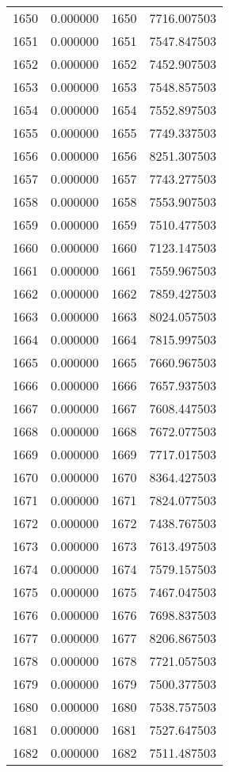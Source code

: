 \documentclass[12pt]{article}
\begin{document}
\begin{longtable}{@{}cccc@{}}
1650 & 0.000000 & 1650 & 7716.007503 \\
1651 & 0.000000 & 1651 & 7547.847503 \\
1652 & 0.000000 & 1652 & 7452.907503 \\
1653 & 0.000000 & 1653 & 7548.857503 \\
1654 & 0.000000 & 1654 & 7552.897503 \\
1655 & 0.000000 & 1655 & 7749.337503 \\
1656 & 0.000000 & 1656 & 8251.307503 \\
1657 & 0.000000 & 1657 & 7743.277503 \\
1658 & 0.000000 & 1658 & 7553.907503 \\
1659 & 0.000000 & 1659 & 7510.477503 \\
1660 & 0.000000 & 1660 & 7123.147503 \\
1661 & 0.000000 & 1661 & 7559.967503 \\
1662 & 0.000000 & 1662 & 7859.427503 \\
1663 & 0.000000 & 1663 & 8024.057503 \\
1664 & 0.000000 & 1664 & 7815.997503 \\
1665 & 0.000000 & 1665 & 7660.967503 \\
1666 & 0.000000 & 1666 & 7657.937503 \\
1667 & 0.000000 & 1667 & 7608.447503 \\
1668 & 0.000000 & 1668 & 7672.077503 \\
1669 & 0.000000 & 1669 & 7717.017503 \\
1670 & 0.000000 & 1670 & 8364.427503 \\
1671 & 0.000000 & 1671 & 7824.077503 \\
1672 & 0.000000 & 1672 & 7438.767503 \\
1673 & 0.000000 & 1673 & 7613.497503 \\
1674 & 0.000000 & 1674 & 7579.157503 \\
1675 & 0.000000 & 1675 & 7467.047503 \\
1676 & 0.000000 & 1676 & 7698.837503 \\
1677 & 0.000000 & 1677 & 8206.867503 \\
1678 & 0.000000 & 1678 & 7721.057503 \\
1679 & 0.000000 & 1679 & 7500.377503 \\
1680 & 0.000000 & 1680 & 7538.757503 \\
1681 & 0.000000 & 1681 & 7527.647503 \\
1682 & 0.000000 & 1682 & 7511.487503 \\

\end{longtable}
\end{document}
